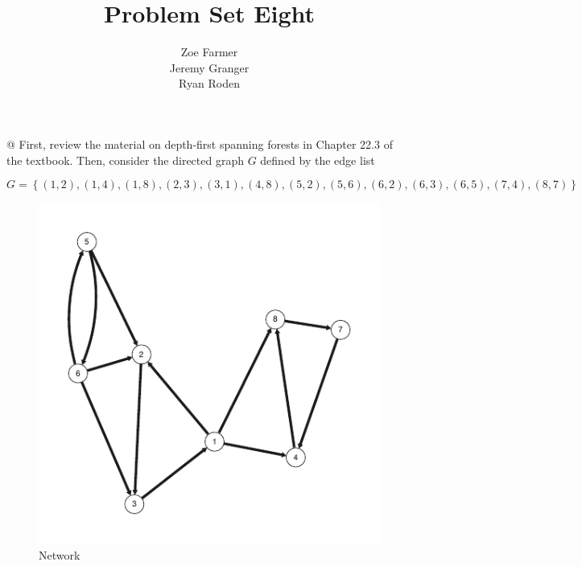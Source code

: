 \documentclass[10pt]{article}\usepackage[]{graphicx}\usepackage[]{xcolor}
\title{Problem Set Eight}
\author{Zoe Farmer\\Jeremy Granger\\Ryan Roden}
\makeatletter
\def\maxwidth{ %
  \ifdim\Gin@nat@width>\linewidth
    \linewidth
  \else
    \Gin@nat@width
  \fi
}
\newenvironment{knitrout}{}{} %
\makeatother
\begin{document}
\maketitle




\begin{easylist}[enumerate]
    @ First, review the material on depth-first spanning forests in Chapter 22.3 of the textbook. Then, consider the
    directed graph $G$ defined by the edge list

    \[
        G =
        \left\{
            (1, 2),
            (1, 4),
            (1, 8),
            (2, 3),
            (3, 1),
            (4, 8),
            (5, 2),
            (5, 6),
            (6, 2),
            (6, 3),
            (6, 5),
            (7, 4),
            (8, 7)
        \right\}
    \]

\begin{knitrout}
\color{fgcolor}\begin{figure}[H]


{\centering \includegraphics[width=\maxwidth]{figure/ps8_1network} 

}

\caption[Network]{Network\label{fig:ps8.1network} }
\end{figure}


\end{knitrout}



\end{easylist}
\end{document}
